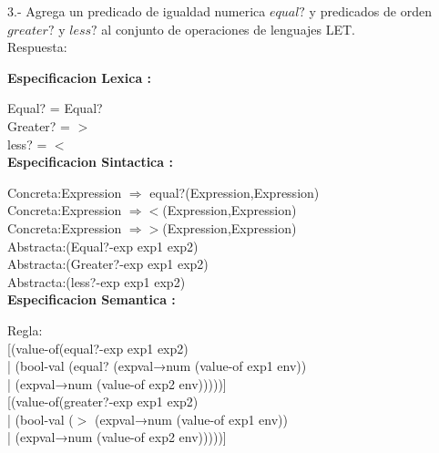 \documentclass{article}
\begin{document}
3.- Agrega un predicado de igualdad numerica $equal?$ y predicados de orden $greater?$ y $less?$ al conjunto de operaciones de lenguajes LET. \\
Respuesta: \newline

\textbf{Especificacion Lexica :} \newline

Equal? = Equal?\\

Greater? = $>$ \\

less? = $<$ \\

\textbf{Especificacion Sintactica :} \newline

Concreta:Expression $\Rightarrow $ equal?(Expression,Expression)\\

Concreta:Expression $\Rightarrow <$(Expression,Expression)\\

Concreta:Expression $\Rightarrow >$(Expression,Expression)\\

Abstracta:(Equal?-exp exp1 exp2)\\

Abstracta:(Greater?-exp exp1 exp2)\\

Abstracta:(less?-exp exp1 exp2)\\

\textbf{Especificacion Semantica :} \newline

Regla: \\

[(value-of(equal?-exp exp1 exp2)\\
| \hspace{1cm}(bool-val (equal? (expval→num (value-of exp1 env))\\
| \hspace{1cm}                  (expval→num (value-of exp2 env)))))]\\

[(value-of(greater?-exp exp1 exp2)\\
| \hspace{1cm}(bool-val ($>$ (expval→num (value-of exp1 env))\\
| \hspace{1cm}            (expval→num (value-of exp2 env)))))]\\
\end{document}
